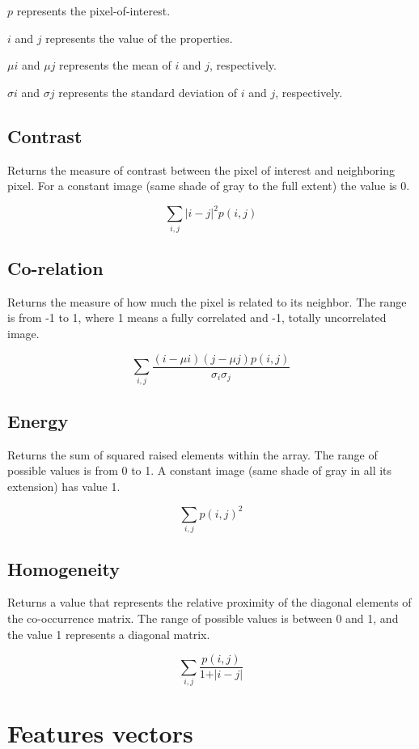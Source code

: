 \documentclass[10pt,twocolumn,letterpaper]{article}
\begin{document}
$p$ represents the pixel-of-interest.

$i$ and $j$ represents the value of the properties.

$\mu i$ and $\mu j$ represents the mean of $i$ and $j$, respectively. 

$\sigma i$ and $\sigma j$ represents the standard deviation of $i$ and $j$, respectively.

\subsection{Contrast}

Returns the measure of contrast between the pixel of interest and neighboring pixel. For a constant image (same shade of gray to the full extent) the value is 0.

$$\sum_{i,j}\vert i - j \lvert^2 p(i,j)$$

\subsection{Co-relation}

Returns the measure of how much the pixel is related to its neighbor. The range is from -1 to 1, where 1 means a fully correlated and -1, totally uncorrelated image.

$$\sum_{i,j} \frac{(i - \mu i) (j - \mu j) p(i,j)} {\sigma_i \sigma_j}$$

\subsection{Energy}

Returns the sum of squared raised elements within the array. The range of possible values is from 0 to 1. A constant image (same shade of gray in all its extension) has value 1.

$$\sum_{i,j} p(i, j)^2$$

\subsection{Homogeneity}

Returns a value that represents the relative proximity of the diagonal elements of the co-occurrence matrix. The range of possible values is between 0 and 1, and the value 1 represents a diagonal matrix.

$$\sum_{i,j} \frac{p(i, j)}{1 + \vert i - j \lvert}$$

\section{Features vectors}
\end{document}
